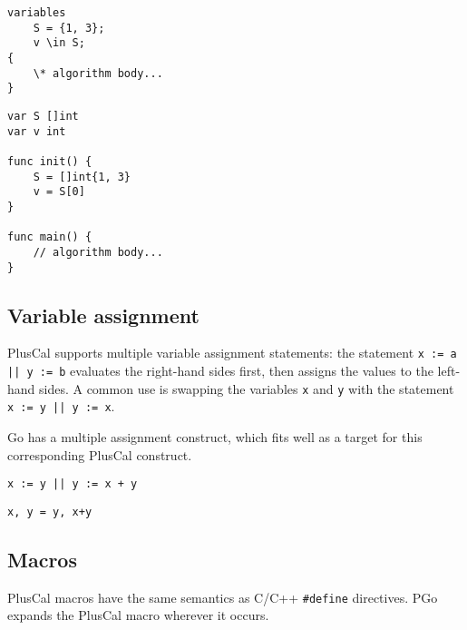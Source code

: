\noindent
\begin{minipage}[t]{0.45\textwidth}
\begin{lstlisting}[language=pcal]
variables
	S = {1, 3};
	v \in S;
{
	\* algorithm body...
}
\end{lstlisting}
\end{minipage}
\hfill
\begin{minipage}[t]{0.45\textwidth}
\begin{lstlisting}[language=golang]
var S []int
var v int

func init() {
	S = []int{1, 3}
	v = S[0]
}

func main() {
	// algorithm body...
}
\end{lstlisting}
\end{minipage}

\subsection{Variable assignment}
PlusCal supports multiple variable assignment statements: the statement \texttt{x := a || y := b} evaluates the right-hand sides first, then assigns the values to the left-hand sides. A common use is swapping the variables \texttt{x} and \texttt{y} with the statement \texttt{x := y || y := x}.

Go has a multiple assignment construct, which fits well as a target for this corresponding PlusCal construct.

\noindent
\begin{minipage}[t]{0.45\textwidth}
\begin{lstlisting}[language=pcal]
x := y || y := x + y
\end{lstlisting}
\end{minipage}
\hfill
\begin{minipage}[t]{0.45\textwidth}
\begin{lstlisting}[language=golang]
x, y = y, x+y
\end{lstlisting}
\end{minipage}

\subsection{Macros}
PlusCal macros have the same semantics as C/C++ \texttt{\#define} directives. PGo expands the PlusCal macro wherever it occurs.

